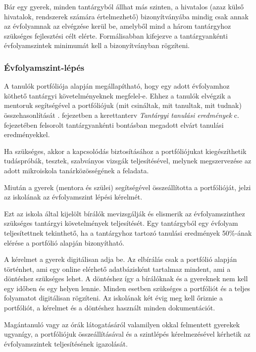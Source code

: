 Bár egy gyerek, minden tantárgyból állhat más szinten, a hivatalos (azaz külső
hivatalok, rendszerek számára értelmezhető) bizonyítványába mindig csak annak
az évfolyamnak
az elvégzése kerül be, amelyből mind a három tantárgyhoz szükséges fejlesztési
célt elérte.
Formálisabban kifejezve a tantárgyankénti évfolyamszintek minimumát kell a
bizonyítványban rögzíteni.

\subsubsection{Évfolyamszint-lépés}
\label{sec:evfolyamszintlepes}
A tanulók portfóliója alapján megállapítható, hogy egy adott évfolyamhoz
köthető tantárgyi követelményeknek megfelel-e.
Ehhez a tanulók elvégzik a mentoruk segítségével a portfóliójuk (mit csináltak,
mit tanultak, mit tudnak) összehasonlítását \ifkerettanterv
      .
      fejezetben
\else
      a kerettanterv \emph{Tantárgyi tanulási eredmények} c. fejezetében
\fi
felsorolt tantárgyankénti bontásban megadott elvárt tanulási eredményekkel.

Ha szükséges, akkor a kapcsolódás biztosításához a portfóliójukat
kiegészíthetik tudáspróbák, tesztek, szabványos vizsgák teljesítésével, melynek
megszervezése az adott mikroiskola tanárközösségének a feladata.

Miután a gyerek (mentora és szülei) segítségével összeállította a portfólióját,
jelzi az iskolának az évfolyamszint lépési kérelmét.

Ezt az iskola által kijelölt bírálók mevizsgálják és elismerik az
évfolyamszinthez szükséges tantárgyi követelmények teljesítését.
Egy tantárgyból egy évfolyam teljesítettnek tekinthető, ha a tantárgyhoz
tartozó tanulási eredmények 50\%-ának elérése a portfólió alapján bizonyítható.

A kérelmet a gyerek digitálisan adja be.
Az elbírálás csak a portfólió alapján történhet, ami egy
online elérhető adatbázisként tartalmaz mindent, ami a döntéshez szükséges
lehet. A döntéshez így a bírálóknak és a gyereknek nem
kell egy időben és egy helyen lennie. Minden esetben szükséges a portfóliót és
a teljes folyamatot digitálisan rögzíteni.
Az iskolának két évig meg kell őriznie a portfóliót, a kérelmet és a döntéshez
használt minden dokumentációt.

Magántanuló vagy az órák látogatásáról valamilyen okkal
felmentett gyerekek ugyanígy, a portfóliójuk összeállításával és a szintlépés
kérelmezésével kérhetik az évfolyamszintek teljesítésének igazolását.

